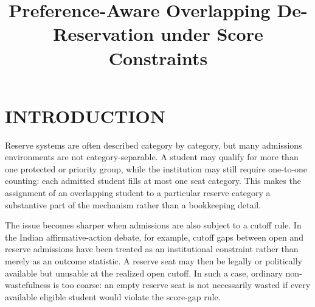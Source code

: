 \documentclass[a4paper,twoside]{article}
\title{Preference-Aware Overlapping De-Reservation under Score Constraints}
\author{\authorname{Anonymous Author(s)}
\affiliation{\sup{1}Anonymous Institution}
\email{anonymous@example.com}
}
\begin{document}


\onecolumn \maketitle \normalsize \setcounter{footnote}{0} \vfill

\section{\uppercase{Introduction}}

Reserve systems are often described category by category, but many admissions environments are not category-separable. A student may qualify for more than one protected or priority group, while the institution may still require one-to-one counting: each admitted student fills at most one seat category. This makes the assignment of an overlapping student to a particular reserve category a substantive part of the mechanism rather than a bookkeeping detail.

The issue becomes sharper when admissions are also subject to a cutoff rule. In the Indian affirmative-action debate, for example, cutoff gaps between open and reserve admissions have been treated as an institutional constraint rather than merely as an outcome statistic. A reserve seat may then be legally or politically available but unusable at the realized open cutoff. In such a case, ordinary non-wastefulness is too coarse: an empty reserve seat is not necessarily wasted if every available eligible student would violate the score-gap rule.
\end{document}
